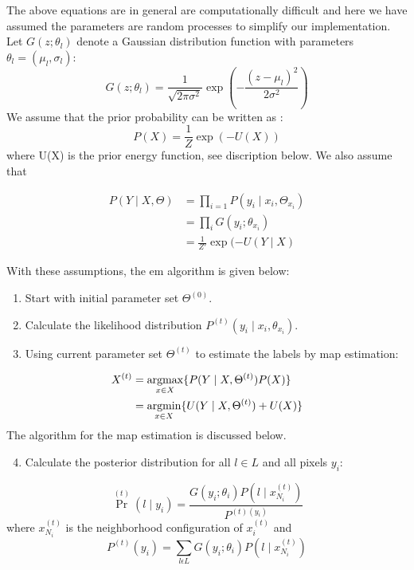 The above equations are in general are computationally difficult and here we have assumed the parameters are random processes to simplify our implementation\cite{monfrini2003image}. Let \(G(z;\theta_l)\) denote a Gaussian distribution function with parameters \(\theta_l=(\mu_l,\sigma_l)\):
\begin{equation}
G(z;\theta_l)= \frac{1}{\sqrt{2\pi\sigma^2}}\exp(-\frac{(z-\mu_l)^2}{2\sigma^2})   
\end{equation}
We assume that the prior probability can be written as \cite{sandberg2004markov}:
\begin{equation}
P(X)=\frac{1}{Z}\exp{(-U(X))}  
\end{equation}
where U(X) is the prior energy function, see discription below. We also assume that


\begin{equation}\label{eq2}
\begin{split}
P( Y \mid X,\Theta) & =\prod_{i=1}^{ }P( y_i \mid x_i,\Theta_{x_i})\\
& =\prod_{i}^{ }G(y_i;\theta_{x_i})\\
& =\frac{1}{Z'}\exp{(-U(Y \mid X)} 
\end{split}
\end{equation}

With these assumptions, the \gls{em} algorithm is given below:

\begin{enumerate}
	\item Start with initial parameter set \(\Theta^{(0)}\).
	\item Calculate the likelihood distribution \(P^{(t)}(y_i \mid x_i,\theta_{x_i})\).
	\item Using current parameter set \(\Theta^{(t)}\) to estimate the labels
	by \gls {map} estimation:
\end{enumerate}

\begin{equation}
\begin{split}
X^{(t)} & =\operatorname*{argmax}_{x \in X}\{P( Y \mid X, \Theta^{(t)})P(X)\}\\
&= \operatorname*{argmin}_{x \in X} \{U( Y \mid X, \Theta^{(t)}) + U(X)\}
\end{split}
\end{equation}
The algorithm for the \gls {map} estimation is discussed below.

\begin{enumerate}
	\setcounter{enumi}{3}
	\item Calculate the posterior distribution for all  \(l \in L\) and  all pixels \(y_i\):
\end{enumerate}
\begin{equation}
\Pr^{(t)}(l \mid y_i)=\frac{G(y_i;\theta_i)P(l \mid x^{(t)}_{N_i})}{P^{(t)(y_i)}}
\end{equation}
where \(x^{(t)}_{N_i}\) is the neighborhood configuration of \(x^{(t)}_i\)
and
\begin{equation}
P^{(t)}(y_i)={\sum\limits_{l \epsilon L} }G(y_i;\theta_i)P(l \mid x^{(t)}_{N_i})
\end{equation}

